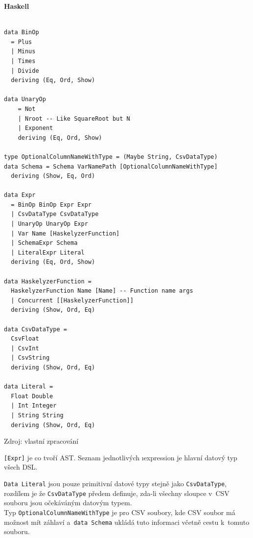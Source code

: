 \documentclass[male, czech]{kithesis}
\newcommand{\haskellInline}[1]{\colorbox{gray!10}{\texttt{#1}}}
\begin{document}
\textbf{Haskell}
\begin{verbatim}

data BinOp
  = Plus
  | Minus
  | Times
  | Divide
  deriving (Eq, Ord, Show)

data UnaryOp
    = Not
    | Nroot -- Like SquareRoot but N 
    | Exponent
    deriving (Eq, Ord, Show)

type OptionalColumnNameWithType = (Maybe String, CsvDataType)
data Schema = Schema VarNamePath [OptionalColumnNameWithType] 
  deriving (Show, Eq, Ord)

data Expr
  = BinOp BinOp Expr Expr
  | CsvDataType CsvDataType 
  | UnaryOp UnaryOp Expr 
  | Var Name [HaskelyzerFunction]
  | SchemaExpr Schema 
  | LiteralExpr Literal
  deriving (Eq, Ord, Show)

data HaskelyzerFunction = 
  HaskelyzerFunction Name [Name] -- Function name args
  | Concurrent [[HaskelyzerFunction]]
  deriving (Show, Ord, Eq)

data CsvDataType = 
  CsvFloat 
  | CsvInt 
  | CsvString 
  deriving (Show, Ord, Eq)

data Literal = 
  Float Double 
  | Int Integer
  | String String
  deriving (Show, Ord, Eq)

\end{verbatim}

\newpage

{
\begin{center}
Zdroj: vlastní zpracování
\end{center}
}

\haskellInline{[Expr]} je co tvoří AST.
Seznam jednotlivých \i{expression} je hlavní datový typ všech DSL. 

\haskellInline{Data Literal} jsou pouze primitivní datové typy stejně jako
\haskellInline{CsvDataType}, 
rozdílem je že \haskellInline{CsvDataType} předem definuje, 
zda-li všechny sloupce v~CSV souboru jsou očekáváným datovým typem. \\
Typ \haskellInline{OptionalColumnNameWithType} je pro CSV soubory, 
kde CSV soubor má možnost
mít záhlaví a~\haskellInline{data Schema} ukládá tuto informaci včetně cestu k~tomuto souboru. 
\end{document}
